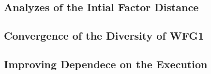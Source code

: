 \begin{figure}[t]
\centering

\label{fig:variable-decision-scalability-3obj}
\end{figure}



\subsection{Analyzes of the Intial Factor Distance}

\begin{figure}[t]
\centering

\label{fig:Initial-distance-factor}
\end{figure}

\subsection{Convergence of the Diversity of WFG1}
\begin{figure}[t]
\centering

\label{fig:Diversity_WFG1}
\end{figure}


\begin{figure}[t]
\centering

\label{fig:Diversity_WFG5}
\end{figure}


\begin{figure}[t]
\centering

\label{fig:Diversity_WFG6}
\end{figure}


\subsection{Improving Dependece on the Execution}


\begin{figure}[t]
\centering

\label{fig:Performance_time}
\end{figure}





%
%


%
%
